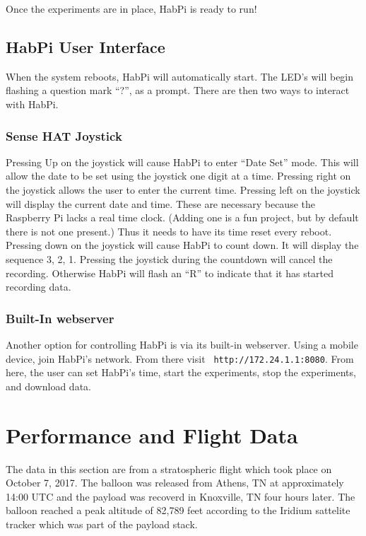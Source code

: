 \documentclass[journal]{new-aiaa}
\begin{document}
Once the experiments are in place, HabPi is ready to run!

\subsection{HabPi User Interface}
When the system reboots, HabPi will automatically start.  The LED's
will begin flashing a question mark ``?'', as a prompt.  There are
then two ways to interact with HabPi. 

\subsubsection{Sense HAT Joystick}
Pressing Up on the joystick will cause HabPi to enter ``Date Set''
mode.  This will allow the date to be set using the joystick one digit
at a time.  Pressing right on the joystick allows the user to enter
the current time.  Pressing left on the joystick will display the
current date and time.  These are necessary because the Raspberry Pi
lacks a real time clock.  (Adding one is a fun project, but by default
there is not one present.)  Thus it needs to have its time reset every
reboot. Pressing down on the joystick will cause HabPi to count down.
It will display the sequence 3, 2, 1.  Pressing the joystick during
the countdown will cancel the recording.  Otherwise HabPi will flash
an ``R'' to indicate that it has started recording data.

\subsubsection{Built-In webserver}
Another option for controlling HabPi is via its built-in webserver.
Using a mobile device, join HabPi's network.  From there visit {\tt
http://172.24.1.1:8080}.  From here, the user can set HabPi's time, start
the experiments, stop the experiments, and download data.

\section{Performance and Flight Data}
The data in this section are from a stratospheric flight which took
place on October 7, 2017.  The balloon was released from Athens, TN 
at approximately 14:00 UTC and the payload was recoverd in 
Knoxville, TN four hours later.  The balloon reached a peak altitude
of 82,789 feet according to the Iridium sattelite tracker which was
part of the payload stack.
\end{document}
